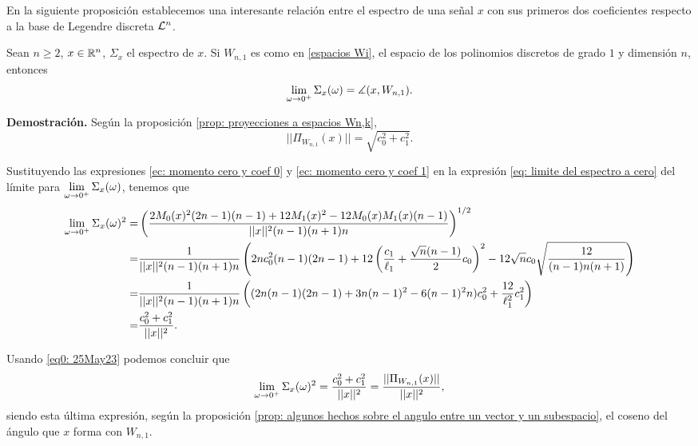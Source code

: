 En la siguiente proposición establecemos
una interesante relación entre el espectro de una señal $x$
con sus primeros dos coeficientes respecto a la base
de Legendre discreta $\mathcal{L}^{n}$.
\begin{prop}
\label{prop: relacion limite cero con legendre}
Sean $n \geq 2$, $x \in \mathbb{R}^{n}$,
$\Sigma_{x}$ el espectro de $x$.
Si $W_{n,1}$ es como en 
\eqref{espacios Wi}, el espacio
de los polinomios discretos de grado $1$ y dimensión $n$, entonces
\begin{equation}
\label{eq: limite por cero como angulo}
\lim\limits_{\omega \rightarrow 0^{+}}{
\Sigma_{x}(\omega)} = \measuredangle(x, W_{n,1}).
\end{equation}
\end{prop}
\noindent
\textbf{Demostración.}
Según la proposición 
\ref{prop: proyecciones a espacios Wn,k}, 
\begin{equation}
\label{eq0: 25May23} 
||\Pi_{W_{n,1}}(x)|| = \sqrt{c_{0}^{2} + c_{1}^{2}}.
\end{equation}

Sustituyendo las expresiones 
\eqref{ec: momento cero y coef 0} y
\eqref{ec: momento cero y coef 1} en la expresión 
\eqref{eq: limite del espectro a cero} del límite para 
$\lim\limits_{\omega \rightarrow 0^{+}}{\Sigma_{x}(\omega)}$,
tenemos que
\begin{align*}
\lim\limits_{\omega \rightarrow 0^{+}}{\Sigma_{x}(\omega)^{2}}
= & 
\left(
\frac{
2M_{0}(x)^{2}(2n-1)(n-1) + 12M_{1}(x)^{2} - 12M_{0}(x)M_{1}(x)(n-1)
}{
||x||^{2} (n-1)(n+1)n}
\right)^{1/2} \\
= & \frac{1}{||x||^{2}
(n-1)(n+1)n
} 
\left(
2nc_{0}^{2}(n-1)(2n-1) + 12
\left(
\frac{c_{1}}{\ell_{1}} + 
\frac{\sqrt{n}(n-1)}{2}c_{0}
\right)^{2}-12
\sqrt{n} c_{0} \sqrt{\frac{12}{
(n-1)n(n+1)
}} 
\right) \\
= & \frac{1}{||x||^{2}
(n-1)(n+1)n}
\left(
(2n(n-1)(2n-1) + 3n(n-1)^{2}-6(n-1)^{2}n)c_{0}^{2}
+ \frac{12}{\ell^{2}_{1}}c_{1}^{2}
\right) \\
= & \frac{c_{0}^{2} + c_{1}^{2}}{||x||^{2}}.
\end{align*}

Usando \eqref{eq0: 25May23} podemos concluir
que
\[
\lim\limits_{\omega \rightarrow 0^{+}}{\Sigma_{x}(\omega)^{2}}
=  \frac{c_{0}^{2} + c_{1}^{2}}{||x||^{2}}
=  \frac{||\Pi_{W_{n,1}}(x)||}{||x||^{2}},
\]
siendo esta última expresión, según la proposición
\ref{prop: algunos hechos sobre el angulo entre un vector y un subespacio}, 
el coseno del ángulo que $x$ forma con $W_{n,1}$.  
\QEDB
\vspace{0.2cm}

